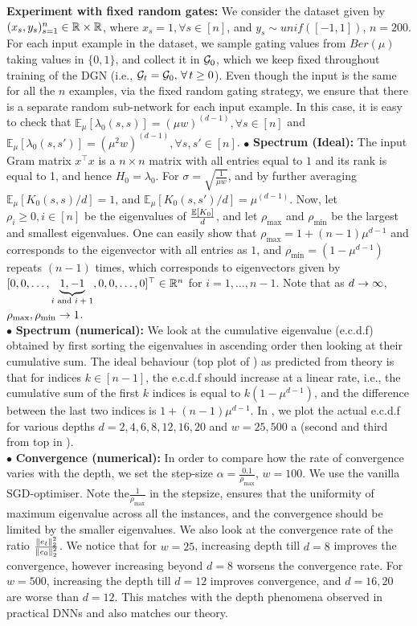 \textbf{Experiment with fixed random gates:} We consider the dataset given by $(x_s,y_s)_{s=1}^n\in \mathbb{R}\times \mathbb{R}$, where $x_s=1,\forall s\in [n]$, and $y_s\sim unif([-1,1])$, $n=200$. For each input example in the dataset, we sample gating values from $Ber(\mu)$ taking values in $\{0,1\}$, and collect it in $\mathcal{G}_0$, which we keep fixed throughout training of the DGN (i.e., $\mathcal{G}_t=\mathcal{G}_0,\,\forall\,t\geq 0$).  Even though the input is the same for all the $n$ examples, via the fixed random gating strategy, we ensure that there is a separate random sub-network for each input example.  In this case, it is easy to check that $\mathbb{E}_{\mu}\left[\lambda_0(s,s)\right]=(\mu w)^{(d-1)},\forall s\in[n]$ and $\mathbb{E}_{\mu}\left[\lambda_0(s,s')\right]=(\mu^2 w)^{(d-1)},\forall s,s'\in[n]$.\WFclear
$\bullet$ \textbf{Spectrum (Ideal):} The input Gram matrix $x^\top x$ is a $n\times n$ matrix with all entries equal to $1$ and its rank is equal to 1, and hence $H_0=\lambda_0$.  For $\sigma=\sqrt{\frac{1}{\mu w}}$, and by further averaging $\mathbb{E}_{\mu}\left[K_0(s,s)/d\right]=1$, and $\mathbb{E}_{\mu}\left[K_0(s,s')/d\right]=\mu^{(d-1)}$. Now, let $\rho_i\geq 0,i \in [n]$ be the eigenvalues of $\frac{\mathbb{E}\left[K_0\right]}{d}$, and let $\rho_{\max}$ and $\rho_{\min}$ be the largest and smallest eigenvalues.  One can easily show that $\rho_{\max}=1+(n-1)\mu^{d-1}$ and corresponds to the eigenvector with all entries as $1$, and $\rho_{\min}=(1-\mu^{d-1})$ repeats $(n-1)$ times,  which corresponds to eigenvectors given by $[0, 0, \ldots, \underbrace{1, -1}_{\text{$i$ and $i+1$}}, 0,0,\ldots, 0]^\top \in \mathbb{R}^n$ for $i=1,\ldots,n-1$. Note that as $d\rightarrow\infty$, $\rho_{\max},\rho_{\min}\rightarrow 1$.\\
$\bullet$ \textbf{Spectrum (numerical):} We look at the cumulative eigenvalue (e.c.d.f) obtained by first sorting the eigenvalues in ascending order then looking at their cumulative sum. The ideal behaviour (top plot of ) as predicted from theory is that for indices $k\in[n-1]$, the e.c.d.f should increase at a linear rate, i.e., the cumulative sum of the first $k$ indices is equal to $k(1-\mu^{d-1})$, and the difference between the last two indices is $1+(n-1)\mu^{d-1}$. In , we plot the actual e.c.d.f for various depths $d=2,4,6,8,12,16,20$ and $w=25,500$ a (second and third from top in ). \hfill\\
$\bullet$ \textbf{Convergence (numerical):} In order to compare how the rate of convergence varies with the depth, we set the step-size $\alpha=\frac{0.1}{\rho_{\max}}$, $w=100$. We use the vanilla SGD-optimiser. Note the$ \frac{1}{\rho_{\max}}$ in the stepsize, ensures that the uniformity of maximum eigenvalue across all the instances, and the convergence should be limited by the smaller eigenvalues. We also look at the convergence rate of the ratio $\frac{\|e_t\|^2_2}{\|e_0\|^2_2}$. We notice that for $w=25$, increasing depth till $d=8$ improves the convergence, however increasing beyond $d=8$ worsens the convergence rate. For $w=500$, increasing the depth till $d=12$ improves convergence, and $d=16,20$ are worse than $d=12$.  This matches with the depth phenomena observed in practical DNNs and also matches our theory.

